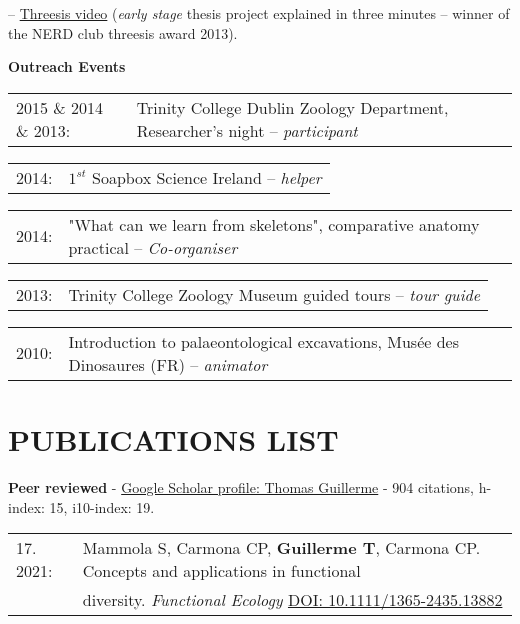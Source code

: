 \documentclass[10pt,a4paper]{article}
\begin{document}
{-- \href{http://www.youtube.com/watch?v=Y3ciaYSvbyU}{Threesis video} (\textit{early stage} thesis project explained in three minutes -- winner of the NERD club threesis award 2013).\\[1.5ex]

\raggedright\textbf{Outreach Events}\\
\begin{tabular}{lp{13cm}}
2015 \& 2014 \& 2013: & Trinity College Dublin Zoology Department, Researcher's night -- \textit{participant}\\
\end{tabular}
\begin{tabular}{ll}
2014: & $1^{st}$ Soapbox Science Ireland -- \textit{helper}\\
\end{tabular}
\begin{tabular}{ll}
2014: & "What can we learn from skeletons", comparative anatomy practical -- \textit{Co-organiser}\\
\end{tabular}
\begin{tabular}{ll}
2013: & Trinity College Zoology Museum guided tours -- \textit{tour guide}\\
\end{tabular}
\begin{tabular}{ll}
2010: & Introduction to palaeontological excavations, Mus\'{e}e des Dinosaures (FR) -- \textit{animator}\\
\end{tabular}
\bigskip

\section{PUBLICATIONS LIST}
\raggedright\textbf{Peer reviewed} - \href{https://scholar.google.co.uk/citations?user=LA9l9EkAAAAJ&hl=en}{Google Scholar profile: Thomas Guillerme} - 904 citations, h-index: 15, i10-index: 19.\\[1.5ex]

\begin{tabular}{ll}
17. 2021: & Mammola S, Carmona CP, \textbf{Guillerme T}, Carmona CP. Concepts and applications in functional\\
      & diversity. \textit{Functional Ecology} \href{https://besjournals.onlinelibrary.wiley.com/doi/10.1111/1365-2435.13882}{DOI: 10.1111/1365-2435.13882}\\
\end{tabular}
\bigskip

}
\end{document}
